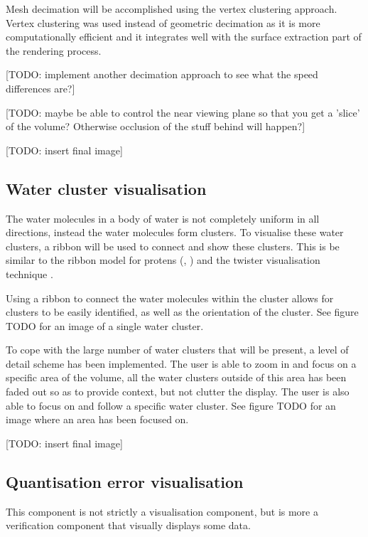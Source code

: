 Mesh decimation will be accomplished using the vertex clustering approach.
Vertex clustering was used instead of geometric decimation as it is more
computationally efficient and it integrates well with the surface extraction
part of the rendering process.

[TODO: implement another decimation approach to see what the speed differences
are?]

[TODO: maybe be able to control the near viewing plane so that you get a
'slice' of the volume? Otherwise occlusion of the stuff behind will happen?]

[TODO: insert final image]


\subsection{Water cluster visualisation}
\label{sub:design_watercluster}

The water molecules in a body of water is not completely uniform in all
directions, instead the water molecules form clusters. To visualise these water
clusters, a ribbon will be used to connect and show these clusters. This is
be similar to the ribbon model for protens (\citep{richardson81},
\citep{carson87}) and the twister visualisation technique \citep{kuttel06}.

Using a ribbon to connect the water molecules within the cluster allows for
clusters to be easily identified, as well as the orientation of the cluster.
See figure TODO for an image of a single water cluster.

To cope with the large number of water clusters that will be present, a level
of detail scheme has been implemented. The user is able to zoom in and focus on
a specific area of the volume, all the water clusters outside of this area has
been faded out so as to provide context, but not clutter the display.  The user
is also able to focus on and follow a specific water cluster. See figure TODO
for an image where an area has been focused on.

[TODO: insert final image]


\subsection{Quantisation error visualisation}
\label{sub:design_quanterror}

This component is not strictly a visualisation component, but is more a
verification component that visually displays some data.

